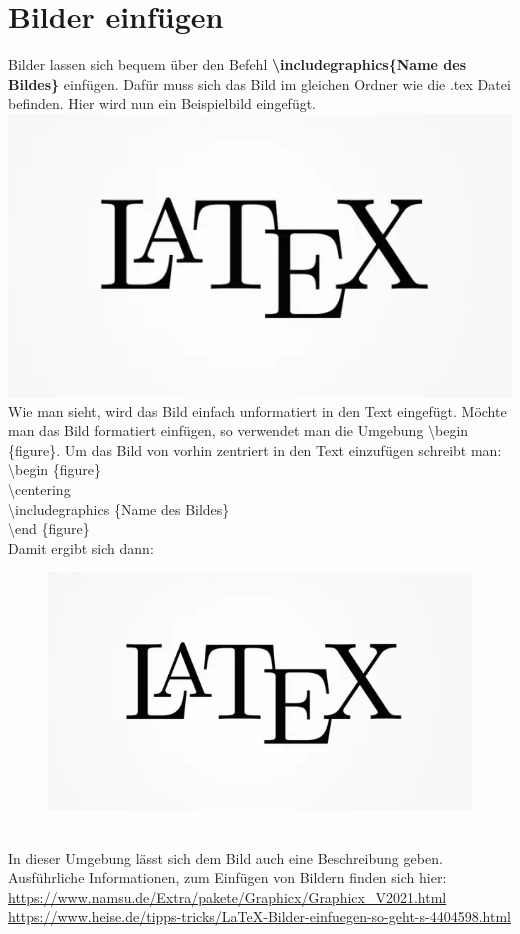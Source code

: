 \documentclass[a4paper, 12pt]{scrreprt}
\begin{document}
\section{Bilder einfügen}
Bilder lassen sich bequem über den Befehl \textbf{\textbackslash includegraphics\{Name des Bildes\}} einfügen. Dafür muss sich das Bild im gleichen Ordner wie die .tex Datei befinden. Hier wird nun ein Beispielbild eingefügt.\\
\includegraphics{LaTeXBild}\\
Wie man sieht, wird das Bild einfach unformatiert in den Text eingefügt. Möchte man das Bild formatiert einfügen, so verwendet man die Umgebung \textbackslash begin \{figure\}.
Um das Bild von vorhin zentriert in den Text einzufügen schreibt man:\\
\textbackslash begin \{figure\}\\
\textbackslash centering\\
\textbackslash includegraphics \{Name des Bildes\}\\
\textbackslash end \{figure\}\\
\newpage
Damit ergibt sich dann:
\begin{figure}[h]
\centering
\includegraphics{LaTeXBild}
\end{figure}\hfill\\
In dieser Umgebung lässt sich dem Bild auch eine Beschreibung geben. Ausführliche Informationen, zum Einfügen von Bildern finden sich hier:\\
\href{https://www.namsu.de/Extra/pakete/Graphicx/Graphicx_V2021.html}{https://www.namsu.de/Extra/pakete/Graphicx/Graphicx\_V2021.html}\\
\href{https://www.heise.de/tipps-tricks/LaTeX-Bilder-einfuegen-so-geht-s-4404598.html}{https://www.heise.de/tipps-tricks/LaTeX-Bilder-einfuegen-so-geht-s-4404598.html}
\end{document}
